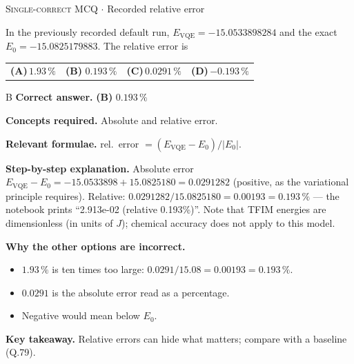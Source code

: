 \documentclass[11pt,a4paper]{article}
\newcommand{\optlabel}[1]{\textbf{(#1)}}
\newcommand{\correctlabel}[1]{\textcolor{okgreen}{\textbf{(#1)}\,\ding{51}}}
\newenvironment{qitem}[1]{\begin{list}{}{\setlength{\leftmargin}{3.3em}\setlength{\labelwidth}{3.1em}%
  \setlength{\labelsep}{0.2em}\setlength{\topsep}{3pt}\setlength{\parsep}{3pt}}\item[\textbf{Q.#1}\hfill]}{\end{list}}
\newcommand{\qsep}{\par\vspace{2pt}{\color{black!15}\hrule}\vspace{4pt}}
\newcommand{\qmeta}[2]{{\footnotesize\color{black!60}\textsc{#1} \;$\cdot$\; #2}\par}
\begin{document}
\begin{qitem}{55}
\qmeta{Single-correct MCQ}{Recorded relative error}
In the previously recorded default run, $E_{\mathrm{VQE}} = -15.0533898284$ and the exact $E_0 = -15.0825179883$. The relative error is
\par\smallskip\noindent\begin{tabularx}{\linewidth}{@{}*{4}{L}@{}}
\optlabel{A}\,$1.93\,\%$ & \correctlabel{B}\,$0.193\,\%$ & \optlabel{C}\,$0.0291\,\%$ & \optlabel{D}\,$-0.193\,\%$
\end{tabularx}
\end{qitem}
\begin{solbox}{B}
\textbf{\color{brand}Correct answer.} \textcolor{okgreen}{\textbf{(B)}} $0.193\,\%$

\textbf{\color{brand}Concepts required.} Absolute and relative error.

\textbf{\color{brand}Relevant formulae.} rel.\ error $= (E_{\mathrm{VQE}} - E_0)/|E_0|$.

\textbf{\color{brand}Step-by-step explanation.} Absolute error $E_{\mathrm{VQE}} - E_0 = -15.0533898 + 15.0825180 = 0.0291282$ (positive, as the variational principle requires). Relative:
$0.0291282/15.0825180 = 0.00193 = 0.193\,\%$ --- the notebook prints ``2.913e-02 (relative 0.193\%)''. Note that TFIM energies are dimensionless
(in units of $J$); chemical accuracy does not apply to this model.

\textbf{\color{brand}Why the other options are incorrect.}
\begin{itemize}[leftmargin=2.4em, itemsep=1pt, topsep=2pt]
\item[\textbf{(A)}] $1.93\,\%$ is ten times too large: $0.0291/15.08 = 0.00193 = 0.193\,\%$.
\item[\textbf{(C)}] $0.0291$ is the absolute error read as a percentage.
\item[\textbf{(D)}] Negative would mean below $E_0$.
\end{itemize}
\textbf{\color{brand}Key takeaway.} Relative errors can hide what matters; compare with a baseline (Q.79).
\end{solbox}
\qsep
\end{document}
